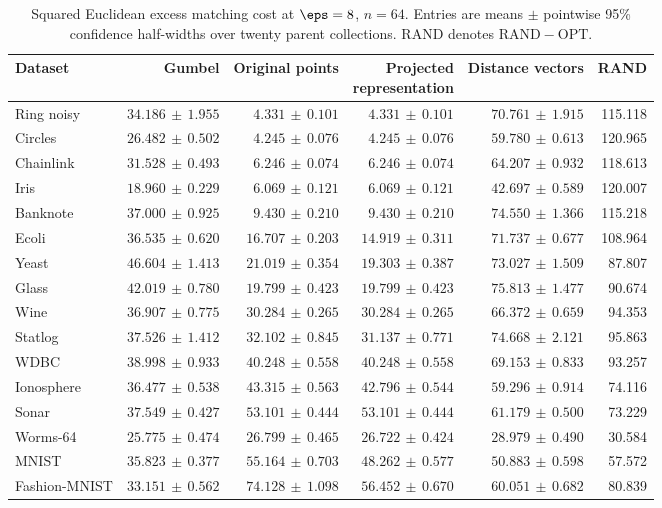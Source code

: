 \begin{table}[p]
\centering\scriptsize
\setlength{\tabcolsep}{3pt}
\caption{Squared Euclidean excess matching cost at $\eps=8$, $n=64$. Entries are means $\pm$ pointwise 95\% confidence half-widths over twenty parent collections. RAND denotes $\mathrm{RAND}-\mathrm{OPT}$.}
\label{tab:exp-bench-p2-eps8}
\begin{tabular}{lrrrrr}
\toprule
Dataset & Gumbel & Original points & \shortstack{Projected\\representation} & Distance vectors & RAND\\
\midrule
Ring noisy & $34.186\,\pm\,1.955$ & $4.331\,\pm\,0.101$ & $4.331\,\pm\,0.101$ & $70.761\,\pm\,1.915$ & 115.118\\
Circles & $26.482\,\pm\,0.502$ & $4.245\,\pm\,0.076$ & $4.245\,\pm\,0.076$ & $59.780\,\pm\,0.613$ & 120.965\\
Chainlink & $31.528\,\pm\,0.493$ & $6.246\,\pm\,0.074$ & $6.246\,\pm\,0.074$ & $64.207\,\pm\,0.932$ & 118.613\\
Iris & $18.960\,\pm\,0.229$ & $6.069\,\pm\,0.121$ & $6.069\,\pm\,0.121$ & $42.697\,\pm\,0.589$ & 120.007\\
Banknote & $37.000\,\pm\,0.925$ & $9.430\,\pm\,0.210$ & $9.430\,\pm\,0.210$ & $74.550\,\pm\,1.366$ & 115.218\\
Ecoli & $36.535\,\pm\,0.620$ & $16.707\,\pm\,0.203$ & $14.919\,\pm\,0.311$ & $71.737\,\pm\,0.677$ & 108.964\\
Yeast & $46.604\,\pm\,1.413$ & $21.019\,\pm\,0.354$ & $19.303\,\pm\,0.387$ & $73.027\,\pm\,1.509$ & 87.807\\
Glass & $42.019\,\pm\,0.780$ & $19.799\,\pm\,0.423$ & $19.799\,\pm\,0.423$ & $75.813\,\pm\,1.477$ & 90.674\\
Wine & $36.907\,\pm\,0.775$ & $30.284\,\pm\,0.265$ & $30.284\,\pm\,0.265$ & $66.372\,\pm\,0.659$ & 94.353\\
Statlog & $37.526\,\pm\,1.412$ & $32.102\,\pm\,0.845$ & $31.137\,\pm\,0.771$ & $74.668\,\pm\,2.121$ & 95.863\\
WDBC & $38.998\,\pm\,0.933$ & $40.248\,\pm\,0.558$ & $40.248\,\pm\,0.558$ & $69.153\,\pm\,0.833$ & 93.257\\
Ionosphere & $36.477\,\pm\,0.538$ & $43.315\,\pm\,0.563$ & $42.796\,\pm\,0.544$ & $59.296\,\pm\,0.914$ & 74.116\\
Sonar & $37.549\,\pm\,0.427$ & $53.101\,\pm\,0.444$ & $53.101\,\pm\,0.444$ & $61.179\,\pm\,0.500$ & 73.229\\
Worms-64 & $25.775\,\pm\,0.474$ & $26.799\,\pm\,0.465$ & $26.722\,\pm\,0.424$ & $28.979\,\pm\,0.490$ & 30.584\\
MNIST & $35.823\,\pm\,0.377$ & $55.164\,\pm\,0.703$ & $48.262\,\pm\,0.577$ & $50.883\,\pm\,0.598$ & 57.572\\
Fashion-MNIST & $33.151\,\pm\,0.562$ & $74.128\,\pm\,1.098$ & $56.452\,\pm\,0.670$ & $60.051\,\pm\,0.682$ & 80.839\\
\bottomrule
\end{tabular}
\end{table}


